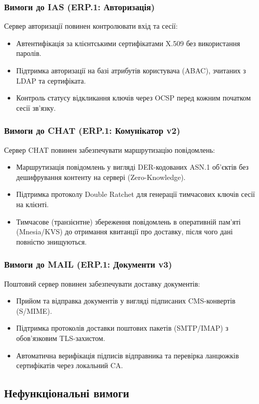 \documentclass{article}
\begin{document}
\subsubsection{Вимоги до IAS (ERP.1: Авторизація)}
Сервер авторизації повинен контролювати вхід та сесії:
\begin{itemize}
    \item Автентифікація за клієнтськими сертифікатами X.509 без використання паролів.
    \item Підтримка авторизації на базі атрибутів користувача (ABAC), зчитаних з LDAP та сертифіката.
    \item Контроль статусу відкликання ключів через OCSP перед кожним початком сесії зв'язку.
\end{itemize}

\subsubsection{Вимоги до CHAT (ERP.1: Комунікатор v2)}
Сервер CHAT повинен забезпечувати маршрутизацію повідомлень:
\begin{itemize}
    \item Маршрутизація повідомлень у вигляді DER-кодованих ASN.1 об'єктів без дешифрування контенту на сервері (Zero-Knowledge).
    \item Підтримка протоколу Double Ratchet для генерації тимчасових ключів сесії на клієнті.
    \item Тимчасове (транзієнтне) збереження повідомлень в оперативній пам'яті (Mnesia/KVS) до отримання квитанції про доставку, після чого дані повністю знищуються.
\end{itemize}

\subsubsection{Вимоги до MAIL (ERP.1: Документи v3)}
Поштовий сервер повинен забезпечувати доставку документів:
\begin{itemize}
    \item Прийом та відправка документів у вигляді підписаних CMS-конвертів (S/MIME).
    \item Підтримка протоколів доставки поштових пакетів (SMTP/IMAP) з обов'язковим TLS-захистом.
    \item Автоматична верифікація підписів відправника та перевірка ланцюжків сертифікатів через локальний CA.
\end{itemize}

\subsection{Нефункціональні вимоги}
\end{document}
